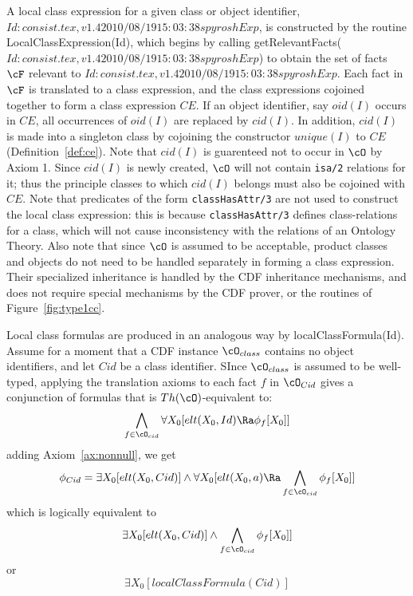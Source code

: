 A local class expression for a given class or object identifier, $Id: consist.tex,v 1.4 2010/08/19 15:03:38 spyrosh Exp $,
is constructed by the routine {\sf LocalClassExpression(Id)}, which
begins by calling {\sf getRelevantFacts($Id: consist.tex,v 1.4 2010/08/19 15:03:38 spyrosh Exp $)} to obtain the set of
facts $\cF$ relevant to $Id: consist.tex,v 1.4 2010/08/19 15:03:38 spyrosh Exp $.  Each fact in $\cF$ is translated to a
class expression, and the class expressions cojoined together to form
a class expression $CE$.  If an object identifier, say $oid(I)$ occurs
in $CE$, all occurrences of $oid(I)$ are replaced by $cid(I)$.  In
addition, $cid(I)$ is made into a singleton class by cojoining the
constructor $unique(I)$ to $CE$ (Definition~\ref{def:ce}).  Note that
$cid(I)$ is guarenteed not to occur in $\cO$ by Axiom 1.  Since
$cid(I)$ is newly created, $\cO$ will not contain {\tt isa/2}
relations for it; thus the principle classes to which $cid(I)$ belongs
must also be cojoined with $CE$.  Note that predicates of the form
{\tt classHasAttr/3} are not used to construct the local class
expression: this is because {\tt classHasAttr/3} defines
class-relations for a class, which will not cause inconsistency with
the relations of an Ontology Theory.  Also note that since $\cO$ is
assumed to be acceptable, product classes and objects do not need to
be handled separately in forming a class expression.  Their
specialized inheritance is handled by the CDF inheritance mechanisms,
and does not require special mechanisms by the CDF prover, or the
routines of Figure~\ref{fig:type1cc}.


Local class formulas are produced in an analogous way by {\sf
localClassFormula(Id)}.  Assume for a moment that a CDF instance
$\cO_{class}$ contains no object identifiers, and let $Cid$ be a class
identifier.  SInce $\cO_{class}$ is assumed to be well-typed, applying
the translation axioms to each fact $f$ in $\cO_{Cid}$ gives a
conjunction of formulas that is $Th(\cO)$-equivalent to:
\[ 
\bigwedge_{f \in \cO_{cid}} \forall X_0 [elt(X_0,Id) \Ra \phi_f[X_0]]
\]
adding Axiom~\ref{ax:nonnull}, we get 
\[ 
\phi_{Cid} = \exists X_0 [elt(X_0,Cid)] \wedge \forall X_0 [elt(X_0,a) \Ra
				\bigwedge_{f \in \cO_{cid}} \phi_f[X_0]] 
\]
which is logically equivalent to 
\[ 
\exists X_0 [elt(X_0,Cid)] \wedge \bigwedge_{f \in \cO_{cid}} \phi_f[X_0]] 
\]
or 
\[ 
\exists X_0 [localClassFormula(Cid)] 
\]

